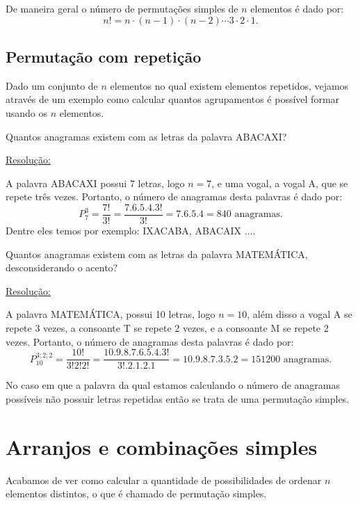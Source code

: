 De maneira geral o número de permutações simples de $n$ elementos é dado por:
\[n!= n \cdot (n-1) \cdot (n-2) \cdots 3 \cdot 2 \cdot 1 .\]



\subsection{Permutação com repetição}

Dado um conjunto de $n$ elementos no qual existem elementos repetidos, vejamos através de um exemplo como calcular quantos agrupamentos é possível formar usando os $n$ elementos.

\begin{exem}
 Quantos anagramas existem com as letras da palavra ABACAXI?

 \underline{Resolução:}

 A palavra ABACAXI possui 7 letras, logo $n=7$, e uma vogal, a vogal A, que se repete três vezes. Portanto, o número de anagramas desta palavras é dado por:
 \[P_{7}^{3}= \frac{7!}{3!}= \frac{7.6.5.4.3!}{3!}= 7.6.5.4= 840 \text{ anagramas.}\]
 Dentre eles temos por exemplo: IXACABA, ABACAIX ....
\end{exem}

\begin{exem}
 Quantos anagramas existem com as letras da palavra MATEMÁTICA, desconsiderando o acento?

 \underline{Resolução:}

 A palavra MATEMÁTICA, possui 10 letras, logo $n=10$, além disso a vogal A se repete 3 vezes, a consoante T se repete 2 vezes, e a consoante M se repete 2 vezes. Portanto, o número de anagramas desta palavras é dado por:
 \[P_{10}^{3;2;2}= \frac{10!}{3!2!2!}= \frac{10.9.8.7.6.5.4.3!}{3!.2.1.2.1}= 10.9.8.7.3.5.2= 151200 \text{ anagramas.} \]

\end{exem}

\begin{obs}
 No caso em que a palavra da qual estamos calculando o número de anagramas possíveis não possuir letras repetidas então se trata de uma permutação simples.
\end{obs}

\section{Arranjos e combinações simples}

Acabamos de ver como calcular a quantidade de possibilidades de ordenar $n$ elementos distintos, o que é chamado de permutação simples.

